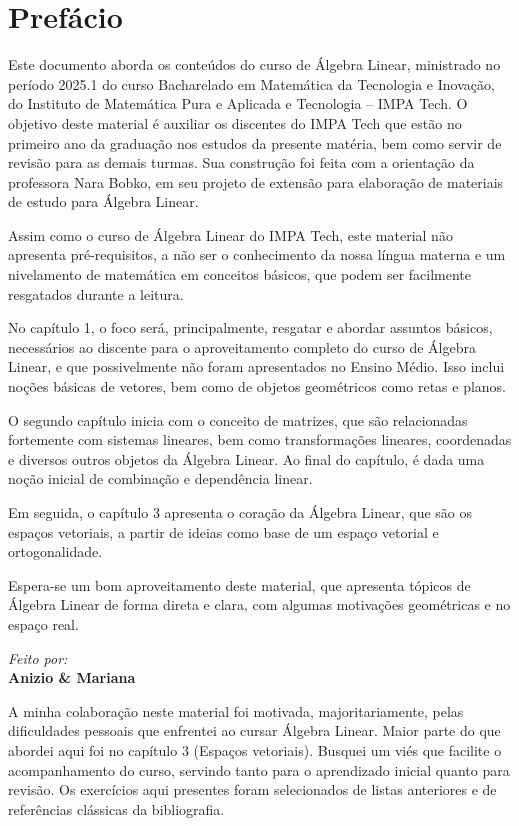 \documentclass[../main.tex]{subfiles}
\begin{document}
	
	\chapter*{Prefácio}
	Este documento aborda os conteúdos do curso de Álgebra Linear, ministrado no período 2025.1 do curso Bacharelado em Matemática da Tecnologia e Inovação, do Instituto de Matemática Pura e Aplicada e Tecnologia -- IMPA Tech. O objetivo deste material é auxiliar os discentes do IMPA Tech que estão no primeiro ano da graduação nos estudos da presente matéria, bem como servir de revisão para as demais turmas. Sua construção foi feita com a orientação da professora Nara Bobko, em seu projeto de extensão para elaboração de materiais de estudo para Álgebra Linear.
	
	Assim como o curso de Álgebra Linear do IMPA Tech, este material não apresenta pré-requisitos, a não ser o conhecimento da nossa língua materna e um nivelamento de matemática em conceitos básicos, que podem ser facilmente resgatados durante a leitura.
	
	No capítulo 1, o foco será, principalmente, resgatar e abordar assuntos básicos, necessários ao discente para o aproveitamento completo do curso de Álgebra Linear, e que possivelmente não foram apresentados no Ensino Médio. Isso inclui noções básicas de vetores, bem como de objetos geométricos como retas e planos.
	
	O segundo capítulo inicia com o conceito de matrizes, que são relacionadas fortemente com sistemas lineares, bem como transformações lineares, coordenadas e diversos outros objetos da Álgebra Linear. Ao final do capítulo, é dada uma noção inicial de combinação e dependência linear.
	
	Em seguida, o capítulo 3 apresenta o coração da Álgebra Linear, que são os espaços vetoriais, a partir de ideias como base de um espaço vetorial e ortogonalidade.
	
	Espera-se um bom aproveitamento deste material, que apresenta tópicos de Álgebra Linear de forma direta e clara, com algumas motivações geométricas e no espaço real.
	\vfill 
	\begin{flushright}
		\textit{Feito por:}\\
		\textbf{Anizio \& Mariana}
	\end{flushright}
	
	\newpage
	A minha colaboração neste material foi motivada, majoritariamente, pelas dificuldades pessoais que enfrentei ao cursar Álgebra Linear. Maior parte do que abordei aqui foi no capítulo 3 (Espaços vetoriais). Busquei um viés que facilite o acompanhamento do curso, servindo tanto para o aprendizado inicial quanto para revisão. Os exercícios aqui presentes foram selecionados de listas anteriores e de referências clássicas da bibliografia.
	
\end{document}
